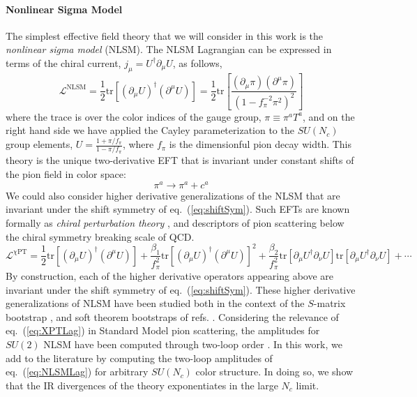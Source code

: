 \documentclass[12pt,letter]{article}
\def\eqn#1{eq.~(\ref{#1})}
\def\be{\begin{equation}}
\def\ee{\end{equation}}
\begin{document}
\paragraph{Nonlinear Sigma Model}
The simplest effective field theory that we will consider in this work is the \textit{nonlinear sigma model} (NLSM). The NLSM Lagrangian can be expressed in terms of the chiral current, $j_\mu = U^\dagger \partial_\mu U$, as follows,
\be\label{eq:NLSMLag}
\mathcal{L}^{\text{NLSM}}= \frac{1}{2}\text{tr}[(\partial_\mu U)^\dagger (\partial ^\mu U)] = \frac{1}{2}\text{tr}\left[\frac{(\partial_\mu\pi )( \partial^\mu \pi) }{(1-f_\pi^{-2}\pi^2)^2}\right]
\ee
where the trace is over the color indices of the gauge group, $\pi \equiv \pi^a T^a$, and on the right hand side we have applied the Cayley parameterization to the $SU(N_c)$ group elements, $U= \frac{1+\pi/f_\pi}{1-\pi/f_\pi}$, where $f_\pi$ is the dimensionful pion decay width. This theory is the unique two-derivative EFT that is invariant under constant shifts of the pion field in color space:
\be\label{eq:shiftSym}
\pi^a \rightarrow \pi^a + c^a
\ee
We could also consider higher derivative generalizations of the NLSM that are invariant under the shift symmetry of \eqn{eq:shiftSym}. Such EFTs are known formally as \textit{chiral perturbation theory} \cite{Weinberg:1978kz,Gasser:1983yg}, and descriptors of pion scattering below the chiral symmetry breaking scale of QCD. 
\be\label{eq:XPTLag}
\mathcal{L}^{\chi\text{PT}}=\frac{1}{2}\text{tr}[(\partial_\mu U)^\dagger (\partial ^\mu U)] + \frac{\beta_1}{f_\pi^2} \text{tr}[(\partial_\mu U)^\dagger (\partial ^\mu U)]^2 + \frac{\beta_2}{f_\pi^2} \text{tr}[\partial_\mu U^\dagger \partial_\nu U]\text{tr}[\partial_\mu U^\dagger \partial_\nu U] +\cdots
\ee
By construction, each of the higher derivative operators appearing above are invariant under the shift symmetry of \eqn{eq:shiftSym}. These higher derivative generalizations of NLSM have been studied both in the context of the $S$-matrix bootstrap \cite{Adams:2006sv,Manohar:2008tc,Bellazzini:2016xrt,Guerrieri:2020bto}, and soft theorem bootstraps of refs. \cite{Cheung:2015ota,Cheung:2016drk,Low:2019ynd}. Considering the relevance of \eqn{eq:XPTLag} in Standard Model pion scattering, the amplitudes for $SU(2)$ NLSM have been computed through two-loop order \cite{Bijnens:1995yn,Bijnens:1997vq,Girlanda:1997ed} . In this work, we add to the literature by computing the two-loop amplitudes of \eqn{eq:NLSMLag} for arbitrary $SU(N_c)$ color structure. In doing so, we show that the IR divergences of the theory exponentiates in the large $N_c$ limit. 
\end{document}
